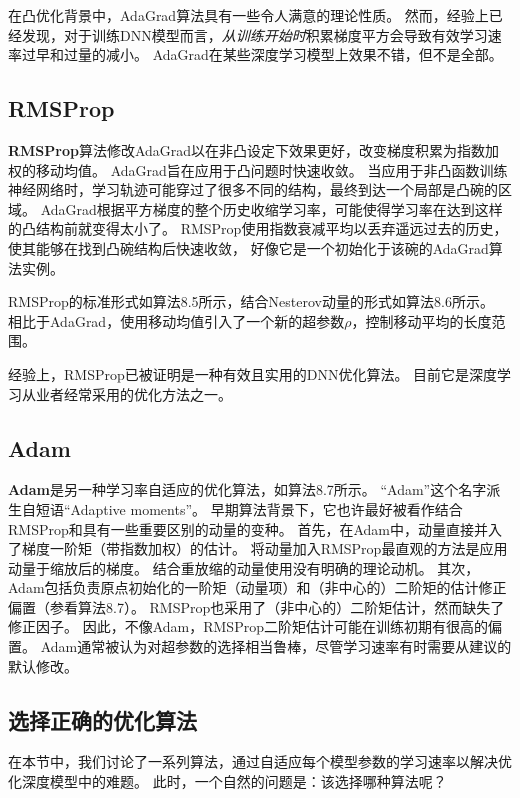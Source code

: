 在凸优化背景中，AdaGrad算法具有一些令人满意的理论性质。
然而，经验上已经发现，对于训练\gls{DNN}模型而言，\emph{从训练开始时}积累梯度平方会导致有效学习速率过早和过量的减小。
AdaGrad在某些深度学习模型上效果不错，但不是全部。

\subsection{RMSProp}
\label{sec:rmsprop}
\textbf{RMSProp}算法\citep{Hinton-ipam2012}修改AdaGrad以在非凸设定下效果更好，改变梯度积累为指数加权的移动均值。
AdaGrad旨在应用于凸问题时快速收敛。
当应用于非凸函数训练神经网络时，学习轨迹可能穿过了很多不同的结构，最终到达一个局部是凸碗的区域。
AdaGrad根据平方梯度的整个历史收缩学习率，可能使得学习率在达到这样的凸结构前就变得太小了。
RMSProp使用指数衰减平均以丢弃遥远过去的历史，使其能够在找到凸碗结构后快速收敛，
好像它是一个初始化于该碗的AdaGrad算法实例。


RMSProp的标准形式如算法8.5所示，结合Nesterov动量的形式如算法8.6所示。
相比于AdaGrad，使用移动均值引入了一个新的超参数$\rho$，控制移动平均的长度范围。


经验上，RMSProp已被证明是一种有效且实用的\gls{DNN}优化算法。
目前它是深度学习从业者经常采用的优化方法之一。

\subsection{Adam}
\label{sec:adam}
\textbf{Adam}\citep{kingma2014adam}是另一种学习率自适应的优化算法，如算法8.7所示。
``Adam''这个名字派生自短语``Adaptive moments''。
早期算法背景下，它也许最好被看作结合RMSProp和具有一些重要区别的动量的变种。
首先，在Adam中，动量直接并入了梯度一阶矩（带指数加权）的估计。
将动量加入RMSProp最直观的方法是应用动量于缩放后的梯度。
结合重放缩的动量使用没有明确的理论动机。
其次，Adam包括负责原点初始化的一阶矩（动量项）和（非中心的）二阶矩的估计修正偏置（参看算法8.7）。
RMSProp也采用了（非中心的）二阶矩估计，然而缺失了修正因子。
因此，不像Adam，RMSProp二阶矩估计可能在训练初期有很高的偏置。
Adam通常被认为对超参数的选择相当鲁棒，尽管学习速率有时需要从建议的默认修改。


\subsection{选择正确的优化算法}
\label{sec:choosing_the_right_optimization_algorithms}
在本节中，我们讨论了一系列算法，通过自适应每个模型参数的学习速率以解决优化深度模型中的难题。
此时，一个自然的问题是：该选择哪种算法呢？

